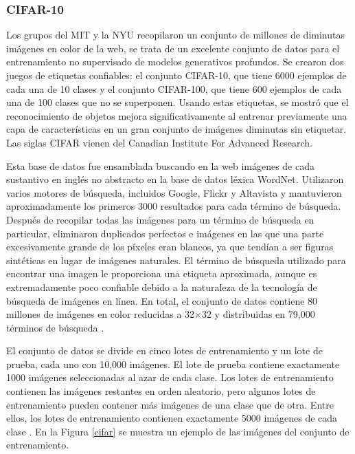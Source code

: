 \subsubsection{CIFAR-10}
Los grupos del MIT y la NYU recopilaron un conjunto de millones de diminutas imágenes en color de la web, se trata de un excelente conjunto de datos para el entrenamiento no supervisado de modelos generativos profundos. Se crearon dos juegos de etiquetas confiables: el conjunto CIFAR-10, que tiene 6000 ejemplos de cada una de 10 clases y el conjunto CIFAR-100, que tiene 600 ejemplos de cada una de 100 clases que no se superponen. Usando estas etiquetas, se mostró que el reconocimiento de objetos mejora significativamente al entrenar previamente una capa de características en un gran conjunto de imágenes diminutas sin etiquetar. Las siglas CIFAR vienen del Canadian Institute For Advanced Research.

Esta base de datos fue ensamblada buscando en la web imágenes de cada sustantivo en inglés no abstracto en la base de datos léxica WordNet. Utilizaron varios motores de búsqueda, incluidos Google, Flickr y Altavista y mantuvieron aproximadamente los primeros 3000 resultados para cada término de búsqueda. Después de recopilar todas las imágenes para un término de búsqueda en particular, eliminaron duplicados perfectos e imágenes en las que una parte excesivamente grande de los píxeles eran blancos, ya que tendían a ser figuras sintéticas en lugar de imágenes naturales. El término de búsqueda utilizado para encontrar una imagen le proporciona una etiqueta aproximada, aunque es extremadamente poco confiable debido a la naturaleza de la tecnología de búsqueda de imágenes en línea. En total, el conjunto de datos contiene 80 millones de imágenes en color reducidas a 32×32 y distribuidas en 79,000 términos de búsqueda \cite{Krizhevsky09learningmultiple}.

El conjunto de datos se divide en cinco lotes de entrenamiento y un lote de prueba, cada uno con 10,000 imágenes. El lote de prueba contiene exactamente 1000 imágenes seleccionadas al azar de cada clase. Los lotes de entrenamiento contienen las imágenes restantes en orden aleatorio, pero algunos lotes de entrenamiento pueden contener más imágenes de una clase que de otra. Entre ellos, los lotes de entrenamiento contienen exactamente 5000 imágenes de cada clase \cite{cifarsite}.  En la Figura \ref{cifar} se muestra un ejemplo de las imágenes del conjunto de entrenamiento.

